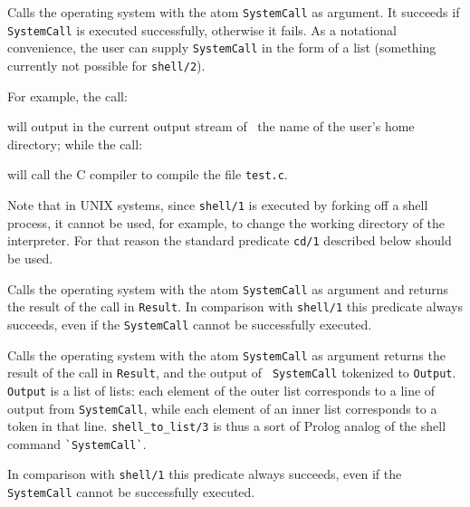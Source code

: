 \begin{description}

    Calls the operating system with the atom {\tt SystemCall} as argument.
    It succeeds if {\tt SystemCall} is executed successfully, otherwise it
    fails.  As a notational convenience, the user can supply {\tt SystemCall} 
    in the form of a list (something currently not possible for {\tt shell/2}).

    For example, the call:


    \noindent
    will output in the current output stream of \ourprolog\ the name of
    the user's home directory; while the call:


    \noindent
    will call the C compiler to compile the file {\tt test.c}.

    Note that in UNIX systems, since {\tt shell/1} is executed by
    forking off a shell process, it cannot be used, for example, to
    change the working directory of the interpreter.  For that reason
    the standard predicate {\tt cd/1} described below should be used.


    Calls the operating system with the atom {\tt SystemCall} as argument
    and returns the result of the call in {\tt Result}.  In comparison with
    {\tt shell/1} this predicate always succeeds, even if the {\tt SystemCall} 
    cannot be successfully executed.

Calls the operating system with the atom {\tt SystemCall} as argument
returns the result of the call in {\tt Result}, and the output of {\tt
  SystemCall} tokenized to {\tt Output}.  {\tt Output} is a list of
lists: each element of the outer list corresponds to a line of output
from {\tt SystemCall}, while each element of an inner list corresponds
to a token in that line.  {\tt shell\_to\_list/3} is thus a sort of
Prolog analog of the shell command \verb|`SystemCall`|.

In comparison with {\tt shell/1} this predicate always succeeds, even
if the {\tt SystemCall} cannot be successfully executed.


\end{description}
